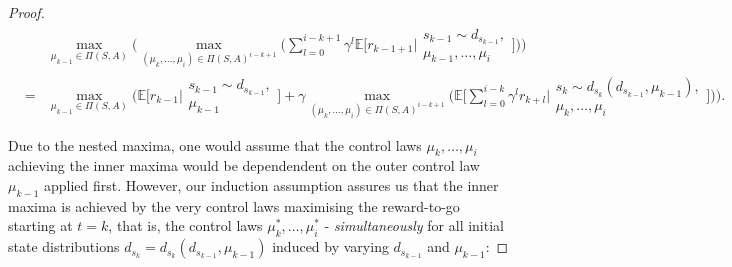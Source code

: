 \documentclass[11pt]{article} %
\begin{document}
\begin{proof}
\begin{equation}
	\begin{array}{rcl}
		& 	 &	\max\limits_{\mu_{k-1} \in \Pi(S,A)} \Big( \max\limits_{(\mu_k,\dots,\mu_i) \in \Pi(S,A)^{i-k+1}} \Big( \sum\limits_{l=0}^{i-k+1} \gamma^l \mathbb{E}\Big[ r_{k-1+1} \Big| 	\begin{array}{c}
																																																s_{k-1} \sim d_{s_{k-1}}, \\
																																																\mu_{k-1},\dots,\mu_i
																																															\end{array} \Big] \Big) \Big) \\
		& =	&	\max\limits_{\mu_{k-1} \in \Pi(S,A)} \Big( \mathbb{E}\Big[ r_{k-1} \Big| \begin{array}{c}
																						s_{k-1} \sim d_{s_{k-1}}, \\
																						\mu_{k-1}
																					\end{array} \Big]  + \gamma \max\limits_{(\mu_k,\dots,\mu_i) \in \Pi(S,A)^{i-k+1}} \Big( \mathbb{E} \Big[ \sum\limits_{l=0}^{i-k} \gamma^l r_{k+l} \Big| \begin{array}{c}
																																																s_k \sim d_{s_k}(d_{s_{k-1}},\mu_{k-1}), \\
																																																\mu_k,\dots,\mu_i
																																															\end{array} \Big] \Big) \Big).
	\end{array}
\end{equation}

Due to the nested maxima, one would assume that the control laws $\mu_k,\dots,\mu_i$ achieving the inner maxima would be dependendent on the outer control law $\mu_{k-1}$ applied first. However, our induction assumption assures us that the inner maxima is achieved by the very control laws maximising the reward-to-go starting at $t = k$, that is, the control laws $\mu_k^*,\dots,\mu_i^*$ - \textit{simultaneously} for all initial state distributions $d_{s_k} = d_{s_k}(d_{s_{k-1}},\mu_{k-1})$ induced by varying $d_{s_{k-1}}$ and $\mu_{k-1}$:


\end{proof}
\end{document}
